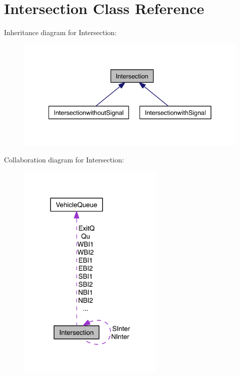 \hypertarget{class_intersection}{\section{Intersection Class Reference}
\label{class_intersection}
}


Inheritance diagram for Intersection\-:\nopagebreak
\begin{figure}[H]
\begin{center}
\leavevmode
\includegraphics[width=337pt]{class_intersection__inherit__graph}
\end{center}
\end{figure}


Collaboration diagram for Intersection\-:\nopagebreak
\begin{figure}[H]
\begin{center}
\leavevmode
\includegraphics[width=199pt]{class_intersection__coll__graph}
\end{center}
\end{figure}
